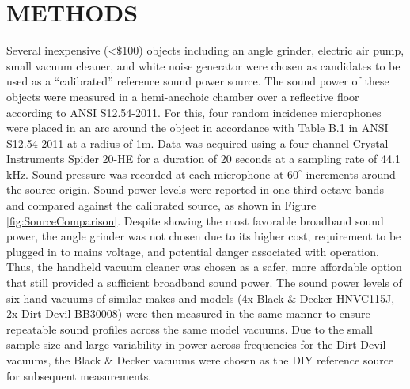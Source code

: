 \documentclass[letterpaper,12pt]{article}
\begin{document}
\section{METHODS}
\noindent

 
 Several inexpensive (<\$100) objects including an angle grinder, electric air pump, small vacuum cleaner, and white noise generator were chosen as candidates to be used as a ``calibrated'' reference sound power source. The sound power of these objects were measured in a hemi-anechoic chamber over a reflective floor according to ANSI S12.54-2011. For this, four random incidence microphones were placed in an arc around the object in accordance with Table B.1 in ANSI S12.54-2011 at a radius of 1m. Data was acquired using a four-channel Crystal Instruments Spider 20-HE for a duration of 20 seconds at a sampling rate of 44.1 kHz. Sound pressure was recorded at each microphone at $60^{\circ}$ increments around the source origin. Sound power levels were reported in one-third octave bands and compared against the calibrated source, as shown in Figure \ref{fig:SourceComparison}. Despite showing the most favorable broadband sound power, the angle grinder was not chosen due to its higher cost, requirement to be plugged in to mains voltage, and potential danger associated with operation. Thus, the handheld vacuum cleaner was chosen as a safer, more affordable option that still provided a sufficient broadband sound power. The sound power levels of six hand vacuums of similar makes and models (4x Black \& Decker HNVC115J, 2x Dirt Devil BB30008) were then measured in the same manner to ensure repeatable sound profiles across the same model vacuums. Due to the small sample size and large variability in power across frequencies for the Dirt Devil vacuums, the Black \& Decker vacuums were chosen as the DIY reference source for subsequent measurements.
\end{document}
